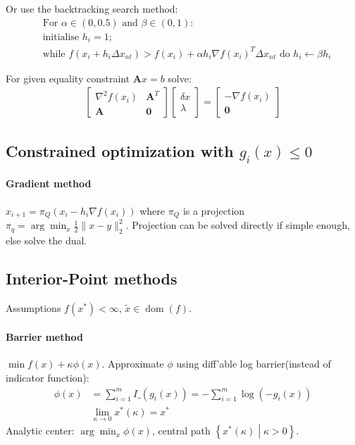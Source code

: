\documentclass[landscape,a4paper,8pt]{scrartcl}
\newcommand\vA{\bm{A}}
\newcommand{\Me}[1]{\begin{bmatrix}#1\end{bmatrix}} %
\DeclareMathOperator\dom{dom}
\begin{document}
\begin{multicols*}{3}
Or use the backtracking search method:
\begin{align*}
&\text{For } \alpha \in (0, 0.5) \text{ and } \beta \in (0,1): \\
&	\text{initialise } h_i = 1; \\
&	\text{while } f(x_i+ h_i\Delta x_{nt}) > f(x_i) + \alpha h_i \nabla f(x_i)^T\Delta x_{nt} \text{ 
	do } h_i \leftarrow \beta h_i
\end{align*}

For given equality constraint $\vA x = b$ solve:
\begin{align*}
\Me{\nabla^2 f(x_i) & \vA^T \\ \vA & \bm 0}\Me{\delta x \\ \lambda} = \Me{-\nabla f(x_i) \\ \bm 0}
\end{align*}

\subsection{Constrained optimization with $g_i(x) \leq 0$}
\paragraph{Gradient method}
$x_{i+1} = \pi_Q(x_i - h_i\nabla f(x_i))$ where $\pi_Q$ is a projection $\pi_q = \arg\min_x\frac{1}{2}\lVert x - y \rVert_2^2$. Projection can be solved directly if simple enough, else solve the dual.

\subsection{Interior-Point methods}
Assumptions $f(x^*) < \infty$, $\tilde x \in \dom(f)$.

\paragraph{Barrier method}
$\min f(x) + \kappa \phi(x)$.
Approximate $\phi$ using diff'able log barrier(instead of indicator function):
\begin{align*}
\phi(x) &= \sum_{i=1}^{m} I\_(g_i(x)) = -\sum_{i=1}^{m} \log(-g_i(x)) \\
        & \lim_{\kappa \rightarrow 0} x^*(\kappa) = x^*
\end{align*}
Analytic center: $\arg\min_x \phi(x)$, central path $\left\{x^*(\kappa) \middle| \kappa > 0 \right\}$.


\end{multicols*}
\end{document}
